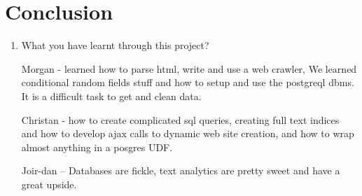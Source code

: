 \documentclass[11pt]{article}
\begin{document}
  \section{Conclusion}
  \begin{enumerate}\item What you have learnt through this project?

    Morgan - learned how to parse html, write and use a web crawler, 
		We learned conditional random fields stuff and how to setup and use
		the postgreql dbms.
    It is a difficult task to get and clean data.

		Christan - how to create complicated sql queries,
		creating full text indices and how to
		develop ajax calls to dynamic web site creation, and how to wrap almost 
		anything in a posgres UDF. 

		Joir-dan -- Databases are fickle, text analytics are pretty sweet and have
		a great upside.


  \end{enumerate}






\end{document}
